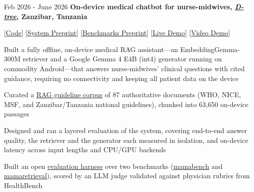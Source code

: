         \begin{twocolentry}{
            Feb 2026 - June 2026
        }
            \textbf{On-device medical chatbot for nurse-midwives, \href{https://www.d-tree.org/}{\textit{D-tree}}, Zanzibar, Tanzania} 
            
            [\href{https://github.com/nmrenyi/mamai}{Code}] [\href{https://arxiv.org/abs/2606.29580}{System Preprint}] [\href{https://arxiv.org/abs/2606.29467}{Benchmarks Preprint}] [\href{https://nmrenyi-mamai-demo.hf.space}{Live Demo}] [\href{https://youtu.be/M_Kruluel28}{Video Demo}]
        \end{twocolentry}
        \vspace{0.10 cm}
        \begin{onecolentry}
            \begin{highlights}
                \item Built a fully offline, on-device medical RAG assistant---an EmbeddingGemma-300M retriever and a Google Gemma 4 E4B (int4) generator running on commodity Android---that answers nurse-midwives' clinical questions with cited guidance, requiring no connectivity and keeping all patient data on the device
                \item Curated a \href{https://github.com/nmrenyi/mamai-medical-guidelines}{RAG guideline corpus} of 87 authoritative documents (WHO, NICE, MSF, and Zanzibar/Tanzania national guidelines), chunked into 63,650 on-device passages
                \item Designed and ran a layered evaluation of the system, covering end-to-end answer quality, the retriever and the generator each measured in isolation, and on-device latency across input lengths and CPU/GPU backends
                \item Built an open \href{https://github.com/nmrenyi/mamai-eval}{evaluation harness} over two benchmarks (\href{https://huggingface.co/datasets/nmrenyi/mamabench}{mamabench} and \href{https://huggingface.co/datasets/nmrenyi/mamaretrieval}{mamaretrieval}), scored by an LLM judge validated against physician rubrics from HealthBench
            \end{highlights}
        \end{onecolentry}





